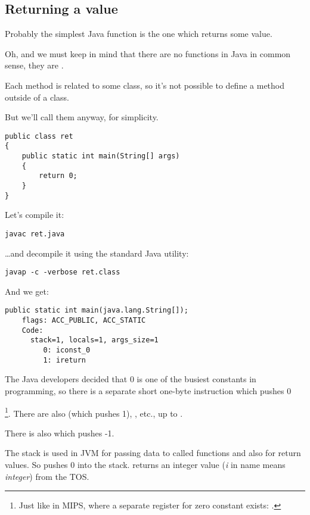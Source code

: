 \subsection{Returning a value}

Probably the simplest Java function is the one which returns some value.

Oh, and we must keep in mind that there are no  functions in Java in common sense,
they are .

Each method is related to some class, so it's not possible to define
a method outside of a class.

But we'll call them  anyway, for simplicity.

\begin{lstlisting}[style=customjava]
public class ret
{
	public static int main(String[] args)
	{
		return 0;
	}
}
\end{lstlisting}

Let's compile it:

\begin{lstlisting}
javac ret.java
\end{lstlisting}

\dots and decompile it using the standard Java utility:

\begin{lstlisting}
javap -c -verbose ret.class
\end{lstlisting}

And we get:

\begin{lstlisting}[caption=JDK 1.7 (excerpt)]
  public static int main(java.lang.String[]);
    flags: ACC_PUBLIC, ACC_STATIC
    Code:
      stack=1, locals=1, args_size=1
         0: iconst_0
         1: ireturn
\end{lstlisting}

The Java developers decided that 0 is one of the busiest constants in programming,
so there is a separate short one-byte  instruction which pushes 0

\footnote{Just like in MIPS, where a separate register for zero constant exists: .}.
There are also  (which pushes 1), , etc., up to .

There is also  which pushes -1.

The stack is used in JVM for passing data to called functions and also for return values.
So  pushes 0 into the stack.
 returns an integer value (\emph{i} in name means \emph{integer}) from the \ac{TOS}.

